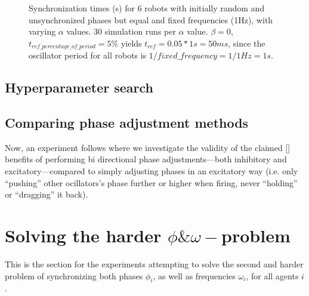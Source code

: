 	
	\begin{figure}[ht!]
		\centering
		\caption{Synchronization times (s) for 6 robots with initially random and unsynchronized phases but equal and fixed frequencies (1Hz), with varying $\alpha$ values. 30 simulation runs per $\alpha$ value. $\beta=0$, $t_{ref\_percentage\_of\_period} = 5\%$ yields $t_{ref}=0.05*1s=50ms$, since the oscillator period for all robots is $1/fixed\_frequency=1/1Hz=1s$.}
	\end{figure}
	
	
	
	\subsection{Hyperparameter search}
	
	\subsection{Comparing phase adjustment methods}
	Now, an experiment follows where we investigate the validity of the claimed [] benefits of performing bi directional phase adjustments—both inhibitory and excitatory—compared to simply adjusting phases in an excitatory way (i.e. only ``pushing'' other ocillators's phase further or higher when firing, never ``holding'' or ``dragging'' it back).
	
	
	
	
	
	
	\section{Solving the harder $\phi\&\omega-$problem}
	
	This is the section for the experiments attempting to solve the second and harder problem of synchronizing both phases $\phi_i$, as well as frequencies $\omega_i$, for all agents $i$.

